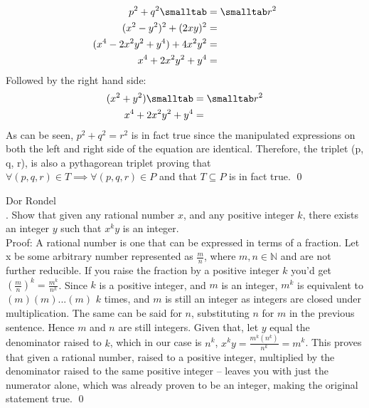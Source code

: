 \documentclass{article}
\begin{document}
\begin{enumerate}
\begin{align*}
p^2 + q^2 \smalltab &= \smalltab r^2 \\
(x^2-y^2)^2 + (2xy)^2 &=  \\
(x^4-2x^2y^2+y^4) + 4x^2y^2 &= \\
x^4 + 2x^2y^2 + y^4 &= \\
\end{align*}
Followed by the right hand side: 
\begin{align*}
(x^2 + y^2) \smalltab &= \smalltab r^2 \\
x^4 + 2x^2y^2 + y^4 &=  \\
\end{align*}
As can be seen, $p^2 + q^2 = r^2$ is in fact true since the manipulated expressions on both the left and right side of the equation are identical. Therefore, the triplet (p, q, r), is also a pythagorean triplet proving that $\forall (p, q, r) \in T \implies \forall (p, q, r) \in P$ and that $T \subseteq P$ is in fact true. \qed
\end{enumerate}
\newpage
Dor Rondel \\
. Show that given any rational number $x$, and any positive integer $k$, there exists an integer $y$ such that $x^k y$ is an integer. \\
\newline
Proof: A rational number is one that can be expressed in terms of a fraction. Let x be some arbitrary number represented as $\frac{m}{n}$, where $m, n \in \mathbb{N}$ and are not further reducible. If you raise the fraction by a positive integer $k$ you'd get  $(\frac{m}{n})^k = \frac{m^k}{n^k}$. Since $k$ is a positive integer, and $m$ is an integer, $m^k$ is equivalent to $(m)(m)...(m)$ $k$ times, and $m$ is still an integer as integers are closed under multiplication. The same can be said for $n$, substituting $n$ for $m$ in the previous sentence. Hence $m$ and $n$ are still integers. Given that, let $y$ equal the denominator raised to $k$, which in our case is $n^k$, $x^ky = \frac{m^k(n^k)}{n^k} = m^k$. This proves that given a rational number, raised to a positive integer, multiplied by the denominator raised to the same positive integer -- leaves you with just the numerator alone, which was already proven to be an integer, making the original statement true. \qed
\end{document}
